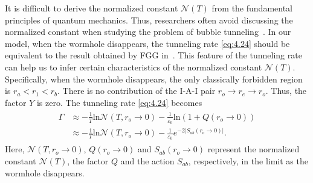 \documentclass[12pt]{article}
\begin{document}
It is difficult to derive the normalized constant $\mathscr{N}(T)$ from the fundamental principles of quantum mechanics. Thus, researchers often avoid discussing the normalized constant when studying the problem of bubble tunneling~\cite{WDJ,SFVF}.  In our model, when the wormhole disappears, the tunneling rate \eqref{eq:4.24} should be equivalent to the result obtained by FGG in~\cite{EAJ}.  This feature of the tunneling rate can help us to infer certain characteristics of the normalized constant $\mathscr{N}(T)$. Specifically, when the wormhole disappears, the only classically forbidden region is $r_{a}<r_{1}<r_{b}$. There is no contribution of the I-A-I pair $r_{o}\rightarrow r_{e}\rightarrow r_{o}$. Thus, the factor $Y$ is zero. The tunneling rate \eqref{eq:4.24} becomes
\begin{eqnarray}\begin{split}
\label{eq:4.25}%
\Gamma&\approx-\frac{1}{T}\mathrm{ln}\mathscr{N}(T, r_{o}\rightarrow 0 )-\frac{1}{\varepsilon_{0}}\mathrm{ln}(1+Q(r_{o}\rightarrow0))\\&\approx-\frac{1}{T}\mathrm{ln}\mathscr{N}(T, r_{o}\rightarrow 0 )-\frac{1}{\varepsilon_{0}}e^{-2|S_{ab}(r_{o}\rightarrow 0)|}.
\end{split}
\end{eqnarray}
Here, $\mathscr{N}(T, r_{o}\rightarrow 0 )$, $Q(r_{o}\rightarrow0)$ and $S_{ab}(r_{o}\rightarrow 0)$ represent the normalized constant $\mathscr{N}(T)$, the factor $Q$ and the action $S_{ab}$, respectively, in the limit as the wormhole disappears.
\end{document}
